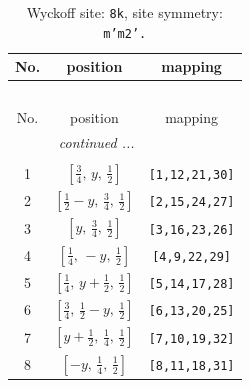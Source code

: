 \documentclass[fleqn,8pt]{jsarticle}
\begin{document}
\begin{longtable}{ccc}
\caption{Wyckoff site: {\tt 8k}, site symmetry: {\tt m'm2'.}}
 \\
 \hline \hline
No. & position & mapping \\ \hline \endfirsthead

\multicolumn{2}{l}{\tablename\ \thetable{}} \\
 \hline \hline
No. & position & mapping \\ \hline \endhead

 \hline \hline
\multicolumn{2}{r}{\footnotesize\it continued ...} \\ \endfoot

 \hline \hline
\multicolumn{2}{r}{} \\ \endlastfoot

1 & $\left[ \frac{3}{4},\, y,\, \frac{1}{2} \right]$ & {\tt [1,12,21,30]} \\ \hline
2 & $\left[ \frac{1}{2} - y,\, \frac{3}{4},\, \frac{1}{2} \right]$ & {\tt [2,15,24,27]} \\ \hline
3 & $\left[ y,\, \frac{3}{4},\, \frac{1}{2} \right]$ & {\tt [3,16,23,26]} \\ \hline
4 & $\left[ \frac{1}{4},\, - y,\, \frac{1}{2} \right]$ & {\tt [4,9,22,29]} \\ \hline
5 & $\left[ \frac{1}{4},\, y + \frac{1}{2},\, \frac{1}{2} \right]$ & {\tt [5,14,17,28]} \\ \hline
6 & $\left[ \frac{3}{4},\, \frac{1}{2} - y,\, \frac{1}{2} \right]$ & {\tt [6,13,20,25]} \\ \hline
7 & $\left[ y + \frac{1}{2},\, \frac{1}{4},\, \frac{1}{2} \right]$ & {\tt [7,10,19,32]} \\ \hline
8 & $\left[ - y,\, \frac{1}{4},\, \frac{1}{2} \right]$ & {\tt [8,11,18,31]} \\
\end{longtable}
\renewcommand{\arraystretch}{1.2}
\end{document}
